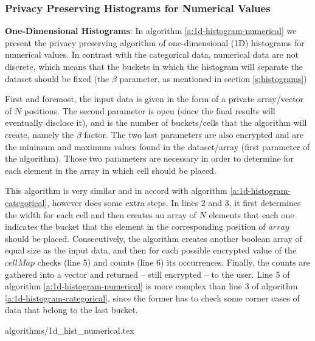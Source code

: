 


\subsubsection{Privacy Preserving Histograms for Numerical Values}\label{sss:histogram-numerical}

\textbf{One-Dimensional Histograms}: In algorithm \ref{a:1d-histogram-numerical} we present the privacy preserving algorithm of one-dimensional (1D) histograms for numerical values.
In contrast with the categorical data, numerical data are not discrete, which means that the buckets in which the histogram will separate the dataset should be fixed (the $\beta$ parameter, as mentioned in section \ref{s:histograms})

First and foremost, the input data is given in the form of a private array/vector of $N$ positions.
The second parameter is open (since the final results will eventually disclose it), and is the number of buckets/cells that the algorithm will create, namely the $\beta$ factor.
The two last parameters are also encrypted and are the minimum and maximum values found in the dataset/array (first parameter of the algorithm).
Those two parameters are necessary in order to determine for each element in the array in which cell should be placed.

This algorithm is very similar and in accord with algorithm \ref{a:1d-histogram-categorical}, however does some extra steps.
In lines 2 and 3, it first determines the width for each cell and then creates an array of $N$ elements that each one indicates the bucket that the element in the corresponding position of $array$ should be placed.
Consecutively, the algorithm creates another boolean array of equal size as the input data, and then for each possible encrypted value of the $cellMap$ checks (line 5) and counts (line 6) its occurrences.
Finally, the counts are gathered into a vector and returned -- still encrypted -- to the user.
Line 5 of algorithm \ref{a:1d-histogram-numerical} is more complex than line 3 of algorithm \ref{a:1d-histogram-categorical}, since the former has to check some corner cases of data that belong to the last bucket.

{algorithms/1d_hist_numerical.tex}



